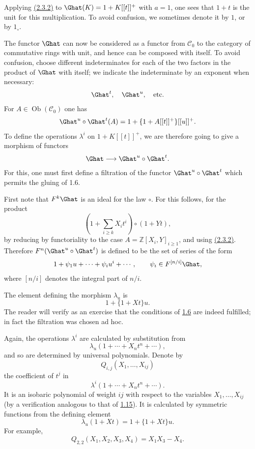 Applying \hyperlink{sga6.e05.eq.2-3-2}{(2.3.2)} to \(\Ghat(K)=1+K[[t]]^+\) with \(a=1\), one sees that \(1+t\) is the unit for this multiplication. To avoid confusion, we sometimes denote it by \(1\), or by \(1_{\circ}\).

The functor \(\Ghat\) can now be considered as a functor from \(\mathcal C_0\) to the category of commutative rings with unit, and hence can be composed with itself. To avoid confusion, choose different indeterminates for each of the two factors in the product of \(\Ghat\) with itself; we indicate the indeterminate by an exponent when necessary:
\[
  \Ghat^t,\quad \Ghat^u,\quad\text{etc.}
\]
For \(A\in\operatorname{Ob}(\mathcal C_0)\) one has
\[
  \Ghat^u\circ \Ghat^t(A)=1+\{1+A[[t]]^+\}[[u]]^+.
\]
To define the operations \(\lambda^i\) on \(1+K[[t]]^+\), we are therefore going to give a morphism of functors
\[
  \Ghat\longrightarrow \Ghat^u\circ\Ghat^t.
\]
For this, one must first define a filtration of the functor \(\Ghat^u\circ\Ghat^t\) which permits the gluing of 1.6.

First note that \(F^k\Ghat\) is an ideal for the law \(\circ\). For this follows, for the product
\[
  \left(1+\sum_{i\geq k}X_i t^i\right)\circ(1+Yt),
\]
by reducing by functoriality to the case \(A=\mathbb Z[X_i,Y]_{i\geq 1}\), and using \hyperlink{sga6.e05.eq.2-3-2}{(2.3.2)}. Therefore \(F^n(\Ghat^u\circ\Ghat^t)\) is defined to be the set of series of the form
\[
  1+\psi_1u+\cdots+\psi_iu^i+\cdots,\qquad
  \psi_i\in F^{[n/i]}\Ghat,
\]
where \([n/i]\) denotes the integral part of \(n/i\).

The element defining the morphism \(\lambda_u\) is
\[
  1+\{1+Xt\}u.
\]
The reader will verify as an exercise that the conditions of \hyperlink{sga6.e05.thm.1-6}{1.6} are indeed fulfilled; in fact the filtration was chosen ad hoc.

Again, the operations \(\lambda^i\) are calculated by substitution from
\[
  \lambda_u(1+\cdots+X_nt^n+\cdots),
\]
and so are determined by universal polynomials. Denote by
\[
  Q_{i,j}(X_1,\ldots,X_{ij})
\]
the coefficient of \(t^j\) in
\[
  \lambda^i(1+\cdots+X_nt^n+\cdots).
\]
It is an isobaric polynomial of weight \(ij\) with respect to the variables \(X_1,\ldots,X_{ij}\) (by a verification analogous to that of \hyperlink{sga6.e05.para.1-15}{1.15}). It is calculated by symmetric functions from the defining element
\begin{equation}\tag{2.3.3}
  \lambda_u(1+Xt)=1+\{1+Xt\}u .
\end{equation}
For example,
\[
  Q_{2,2}(X_1,X_2,X_3,X_4)=X_1X_3-X_4.
\]

